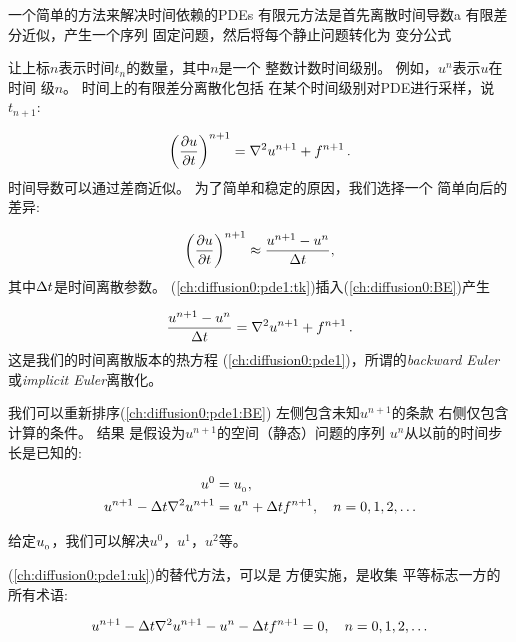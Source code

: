 一个简单的方法来解决时间依赖的PDEs
有限元方法是首先离散时间导数a
有限差分近似，产生一个序列
固定问题，然后将每个静止问题转化为
变分公式

让上标$n$表示时间$t_n$的数量，其中$n$是一个
整数计数时间级别。 例如，$u^n$表示$u$在时间
级$n$。 时间上的有限差分离散化包括
在某个时间级别对PDE进行采样，说$t_{n + 1}$:


\begin{equation}
\left({\partial u \over\partial t}\right)^{n+1} = \nabla^2 u^{n+1} + f^{n+1}\tp
\label{ch:diffusion0:pde1:tk}
\end{equation}
时间导数可以通过差商近似。
为了简单和稳定的原因，我们选择一个
简单向后的差异:


\begin{equation}
\left({\partial u\over\partial t}\right)^{n+1}\approx {{u^{n+1} - u^n}\over{\dt}},
\label{ch:diffusion0:BE}
\end{equation}
其中$\dt$是时间离散参数。
(\ref{ch:diffusion0:pde1:tk})插入(\ref{ch:diffusion0:BE})产生

\begin{equation}
{{u^{n+1} - u^n}\over{\dt}} = \nabla^2 u^{n+1} + f^{n+1}\tp
\label{ch:diffusion0:pde1:BE}
\end{equation}
这是我们的时间离散版本的热方程
(\ref{ch:diffusion0:pde1})，所谓的\emph{backward Euler}或\emph{implicit
  Euler}离散化。

我们可以重新排序(\ref{ch:diffusion0:pde1:BE})
左侧包含未知$u^{n+1}$的条款
右侧仅包含计算的条件。 结果
是假设为$u^{n+1}$的空间（静态）问题的序列
$u^n$从以前的时间步长是已知的:

\begin{align}
u^0 &= \uI, \label{ch:diffusion0:pde1:u0}\\
u^{n+1} - {\dt}\nabla^2 u^{n+1} &=  u^n + {\dt} f^{n+1},\quad n=0,1,2,\ldots
\label{ch:diffusion0:pde1:uk}
\end{align}

给定$\uI$，我们可以解决$u^0$，$u^1$，$u^2$等。

(\ref{ch:diffusion0:pde1:uk})的替代方法，可以是
方便实施，是收集
平等标志一方的所有术语:

\begin{equation}
u^{n+1} - {\dt}\nabla^2 u^{n+1} -  u^{n} - {\dt} f^{n+1} = 0,\quad n=0,1,2,\ldots
\label{ch:diffusion0:pde1:uk2}
\end{equation}

